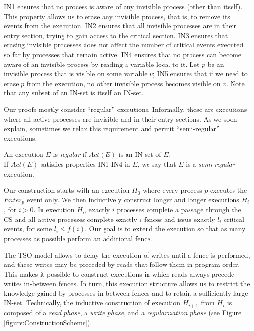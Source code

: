IN1 ensures that no process is aware of any invisible process (other than itself). This property allows us to erase any invisible process, that is, to remove its events from the execution. IN2 ensures that all invisible processes are in their entry section, trying to gain access to the critical section. IN3 ensures that erasing invisible processes does not affect the number of critical events executed so far by processes that remain active. IN4 ensures that no process can become aware of an invisible process by reading a variable local to it.
Let $p$ be an invisible process that is visible on some variable $v$; IN5 ensures that if we need to erase $p$ from the execution, no other invisible process becomes visible on $v$. Note that any subset of an IN-set is itself an IN-set.

Our proofs mostly consider ``regular'' executions. Informally, these are executions where all active processes are invisible and in their entry sections. As we soon explain, sometimes we relax this requirement and permit ``semi-regular'' executions.
	
\begin{definition} \label{def: regular-and-semi-regular}
	An execution $E$ is \emph{regular} if $Act(E)$ is an IN-set of $E$.
	\\ If $Act(E)$ satisfies properties IN1-IN4 in $E$, we say that $E$ is a \emph{semi-regular} execution.
\end{definition}

Our construction starts with an execution $H_0$ where every process $p$ executes the $Enter_p$ event only. We then inductively construct longer and longer executions $H_i$, for $i>0$. In execution $H_i$, exactly $i$ processes complete a passage through the CS and all active processes complete exactly $i$ fences and issue exactly $l_i$ critical events, for some $l_i \leq f(i)$. Our goal is to extend the execution so that as many processes as possible perform an additional fence.

The TSO model allows to delay the execution of writes until a fence is performed, and these writes may be preceded by reads that follow them in program order. This makes it possible to construct executions in which reads always precede writes in-between fences. In turn, this execution structure allows us to restrict the knowledge gained by processes in-between fences and to retain a sufficiently large IN-set. Technically, the inductive construction of  execution $H_{i+1}$ from $H_i$ is composed of a \emph{read phase}, a \emph{write phase}, and a \emph{regularization phase} (see Figure \ref{figure:ConstructionScheme}).


